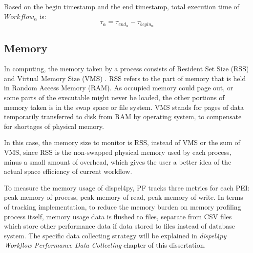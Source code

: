 \documentclass[10pt,twoside,openright,logo]{report}
\begin{document}
Based on the begin timestamp and the end timestamp, total execution time of $Workflow_\alpha$ is:
$$\tau_{\alpha} = \tau_{end_{\alpha}} - \tau_{begin_{\alpha}}$$

\subsection{Memory}
In computing, the memory taken by a process consists of Resident Set Size (RSS) and Virtual Memory Size (VMS) . RSS refers to the part of memory that is held in Random Access Memory (RAM). As occupied memory could page out, or some parts of the executable might never be loaded, the other portions of memory taken is in the swap space or file system. VMS stands for pages of data temporarily transferred to disk from RAM by operating system, to compensate for shortages of physical memory.

In this case, the memory size to monitor is RSS, instead of VMS or the sum of VMS, since RSS is the non-swapped physical memory used by each process, minus a small amount of overhead, which gives the user a better idea of the actual space efficiency of current workflow.

To measure the memory usage of dispel4py, PF tracks three metrics for each PEI: peak memory of process, peak memory of read, peak memory of write. In terms of tracking implementation, to reduce the memory burden on memory profiling process itself, memory usage data is flushed to files, separate from CSV files which store other performance data if data stored to files instead of database system. The specific data collecting strategy will be explained in \textit{dispel4py Workflow Performance Data Collecting} chapter of this dissertation.
\end{document}
